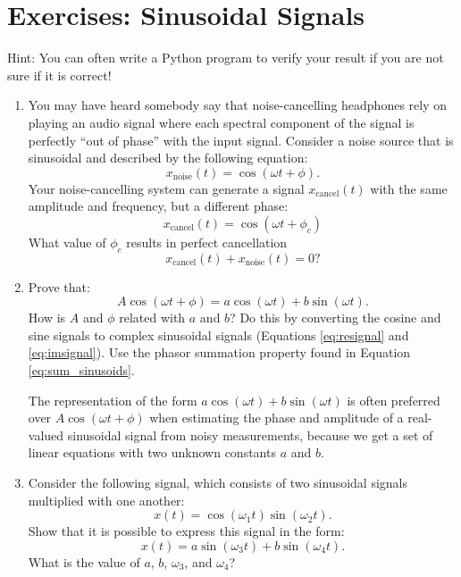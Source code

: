 \newpage
\section{Exercises: Sinusoidal Signals}

Hint: You can often write a Python program to verify your result if you are not sure if it is correct!

\begin{enumerate}

\item You may have heard somebody say that noise-cancelling headphones
  rely on playing an audio signal where each spectral component of the
  signal is perfectly ``out of phase'' with the input signal. Consider
  a noise source that is sinusoidal and described by the following
  equation:
\begin{equation}
x_{\mathrm{noise}}(t) = \cos(\omega t + \phi).
\end{equation}
Your noise-cancelling system can generate a signal
$x_{\mathrm{cancel}}(t)$ with the same amplitude and frequency, but a different phase:
\begin{equation}
x_{\mathrm{cancel}}(t) = \cos(\omega t + \phi_c)
\end{equation}
What value of $\phi_c$ results in perfect cancellation
\begin{equation}
  x_{\mathrm{cancel}}(t) + x_{\mathrm{noise}}(t) = 0?
\end{equation}

\item Prove that:
\begin{equation}
A\cos(\omega t + \phi) = a\cos(\omega t) + b\sin(\omega t). 
\end{equation}
How is $A$ and $\phi$ related with $a$ and $b$? Do this by converting the cosine and sine signals to complex sinusoidal signals (Equations \ref{eq:resignal} and \ref{eq:imsignal}). Use the phasor summation property found in Equation \ref{eq:sum_sinusoids}.

The representation of the form $a\cos(\omega t) + b\sin(\omega t)$ is often preferred over $A\cos(\omega t + \phi)$ when estimating the phase and amplitude of a real-valued sinusoidal signal from noisy measurements, because we get a set of linear equations with two unknown constants $a$ and $b$.

\item Consider the following signal, which consists of two sinusoidal signals multiplied with one another:
\begin{equation}
x(t) = \cos(\omega_1 t)\sin(\omega_2 t).
\end{equation}
Show that it is possible to express this signal in the form:
\begin{equation}
x(t) = a \sin (\omega_3 t) + b \sin(\omega_4 t).
\end{equation}
What is the value of $a$, $b$, $\omega_3$, and $\omega_4$?



\end{enumerate}
